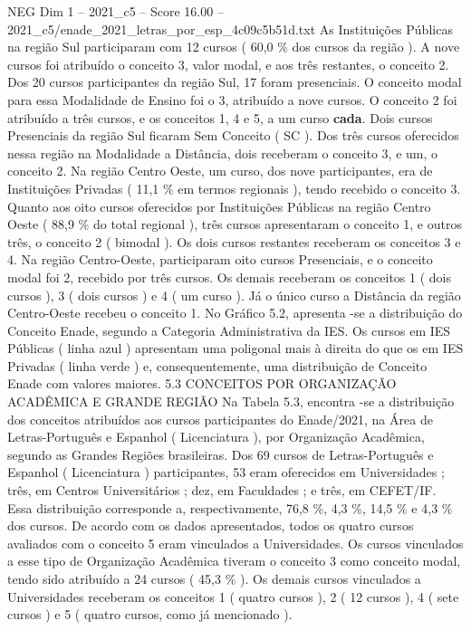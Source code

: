 \begin{textsample}{NEG Dim 1 – 2021\_c5 – Score 16.00 – 2021\_c5/enade\_2021\_letras\_por\_esp\_4c09c5b51d.txt}
As Instituições Públicas na região Sul participaram com 12 cursos ( 60,0 \% dos cursos da região ).
A nove cursos foi atribuído o conceito 3, valor modal, e aos três restantes, o conceito 2.
Dos 20 cursos participantes da região Sul, 17 foram presenciais.
O conceito modal para essa Modalidade de Ensino foi o 3, atribuído a nove cursos.
O conceito 2 foi atribuído a três cursos, e os conceitos 1, 4 e 5, a um curso \textbf{cada}.
Dois cursos Presenciais da região Sul ficaram Sem Conceito ( SC ).
Dos três cursos oferecidos nessa região na Modalidade a Distância, dois receberam o conceito 3, e um, o conceito 2.
Na região Centro Oeste, um curso, dos nove participantes, era de Instituições Privadas ( 11,1 \% em termos regionais ), tendo recebido o conceito 3.
Quanto aos oito cursos oferecidos por Instituições Públicas na região Centro Oeste ( 88,9 \% do total regional ), três cursos apresentaram o conceito 1, e outros três, o conceito 2 ( bimodal ).
Os dois cursos restantes receberam os conceitos 3 e 4.
Na região Centro-Oeste, participaram oito cursos Presenciais, e o conceito modal foi 2, recebido por três cursos.
Os demais receberam os conceitos 1 ( dois cursos ), 3 ( dois cursos ) e 4 ( um curso ).
Já o único curso a Distância da região Centro-Oeste recebeu o conceito 1.
No Gráfico 5.2, apresenta -se a distribuição do Conceito Enade, segundo a Categoria Administrativa da IES.
Os cursos em IES Públicas ( linha azul ) apresentam uma poligonal mais à direita do que os em IES Privadas ( linha verde ) e, consequentemente, uma distribuição de Conceito Enade com valores maiores. 5.3 CONCEITOS POR ORGANIZAÇÃO ACADÊMICA E GRANDE REGIÃO Na Tabela 5.3, encontra -se a distribuição dos conceitos atribuídos aos cursos participantes do Enade/2021, na Área de Letras-Português e Espanhol ( Licenciatura ), por Organização Acadêmica, segundo as Grandes Regiões brasileiras.
Dos 69 cursos de Letras-Português e Espanhol ( Licenciatura ) participantes, 53 eram oferecidos em Universidades ; três, em Centros Universitários ; dez, em Faculdades ; e três, em CEFET/IF.
Essa distribuição corresponde a, respectivamente, 76,8 \%, 4,3 \%, 14,5 \% e 4,3 \% dos cursos.
De acordo com os dados apresentados, todos os quatro cursos avaliados com o conceito 5 eram vinculados a Universidades.
Os cursos vinculados a esse tipo de Organização Acadêmica tiveram o conceito 3 como conceito modal, tendo sido atribuído a 24 cursos ( 45,3 \% ).
Os demais cursos vinculados a Universidades receberam os conceitos 1 ( quatro cursos ), 2 ( 12 cursos ), 4 ( sete cursos ) e 5 ( quatro cursos, como já mencionado ).

\end{textsample}
